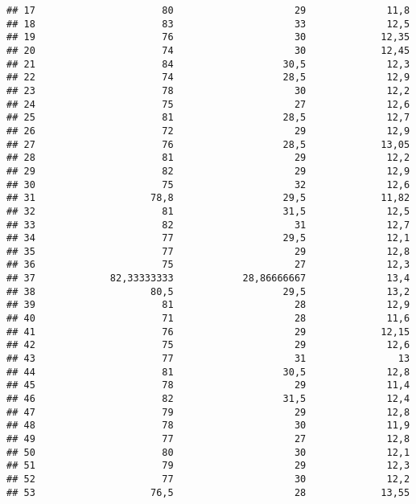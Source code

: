 \documentclass[
]{article}
\begin{document}
\begin{verbatim}
## 17                      80                     29              11,8
## 18                      83                     33              12,5
## 19                      76                     30             12,35
## 20                      74                     30             12,45
## 21                      84                   30,5              12,3
## 22                      74                   28,5              12,9
## 23                      78                     30              12,2
## 24                      75                     27              12,6
## 25                      81                   28,5              12,7
## 26                      72                     29              12,9
## 27                      76                   28,5             13,05
## 28                      81                     29              12,2
## 29                      82                     29              12,9
## 30                      75                     32              12,6
## 31                    78,8                   29,5             11,82
## 32                      81                   31,5              12,5
## 33                      82                     31              12,7
## 34                      77                   29,5              12,1
## 35                      77                     29              12,8
## 36                      75                     27              12,3
## 37             82,33333333            28,86666667              13,4
## 38                    80,5                   29,5              13,2
## 39                      81                     28              12,9
## 40                      71                     28              11,6
## 41                      76                     29             12,15
## 42                      75                     29              12,6
## 43                      77                     31                13
## 44                      81                   30,5              12,8
## 45                      78                     29              11,4
## 46                      82                   31,5              12,4
## 47                      79                     29              12,8
## 48                      78                     30              11,9
## 49                      77                     27              12,8
## 50                      80                     30              12,1
## 51                      79                     29              12,3
## 52                      77                     30              12,2
## 53                    76,5                     28             13,55

\end{verbatim}
\end{document}

